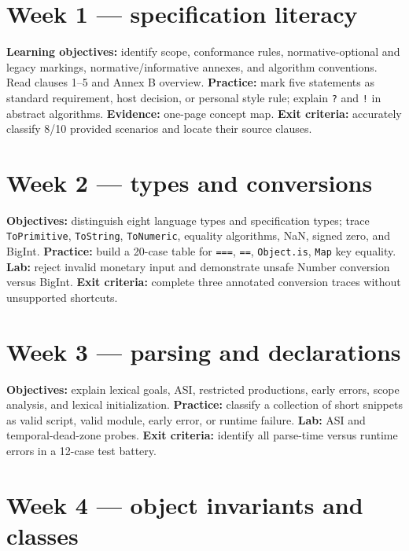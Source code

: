 \documentclass[11pt,letterpaper]{article}
\newcommand{\passthrough}[1]{#1}
\begin{document}
\section{Week 1 --- specification literacy}\label{week-1-specification-literacy}

\textbf{Learning objectives:} identify scope, conformance rules, normative-optional and legacy markings, normative/informative annexes, and algorithm conventions. Read clauses 1--5 and Annex B overview. \textbf{Practice:} mark five statements as standard requirement, host decision, or personal style rule; explain \passthrough{\lstinline!?!} and \passthrough{\lstinline"!"} in abstract algorithms. \textbf{Evidence:} one-page concept map. \textbf{Exit criteria:} accurately classify 8/10 provided scenarios and locate their source clauses.

\section{Week 2 --- types and conversions}\label{week-2-types-and-conversions}

\textbf{Objectives:} distinguish eight language types and specification types; trace \passthrough{\lstinline!ToPrimitive!}, \passthrough{\lstinline!ToString!}, \passthrough{\lstinline!ToNumeric!}, equality algorithms, NaN, signed zero, and BigInt. \textbf{Practice:} build a 20-case table for \passthrough{\lstinline!===!}, \passthrough{\lstinline!==!}, \passthrough{\lstinline!Object.is!}, \passthrough{\lstinline!Map!} key equality. \textbf{Lab:} reject invalid monetary input and demonstrate unsafe Number conversion versus BigInt. \textbf{Exit criteria:} complete three annotated conversion traces without unsupported shortcuts.

\section{Week 3 --- parsing and declarations}\label{week-3-parsing-and-declarations}

\textbf{Objectives:} explain lexical goals, ASI, restricted productions, early errors, scope analysis, and lexical initialization. \textbf{Practice:} classify a collection of short snippets as valid script, valid module, early error, or runtime failure. \textbf{Lab:} ASI and temporal-dead-zone probes. \textbf{Exit criteria:} identify all parse-time versus runtime errors in a 12-case test battery.

\section{Week 4 --- object invariants and classes}\label{week-4-object-invariants-and-classes}
\end{document}
